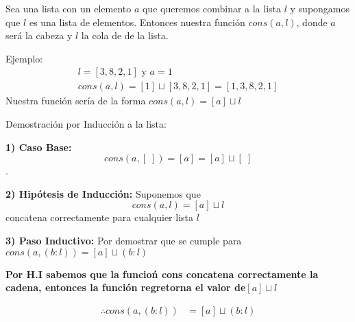    Sea una lista con un elemento $a$ que queremos combinar a la lista $l$ y supongamos que $l$ es una lista de elementos.
    Entonces nuestra función $cons(a,l)$, donde $a$ será la cabeza y $l$ la cola de de la lista.

    Ejemplo:
    \begin{gather*}
        l=[3,8,2,1] \text{ y } a=1\\
        cons(a,l)=[1]\sqcup [3,8,2,1] = [1,3,8,2,1]
    \end{gather*}
    Nuestra función sería de la forma $cons(a,l)=[a]\sqcup l$

    Demostración por Inducción a la lista:

    \textbf{1) Caso Base:} $$cons(a,[\;]) =[a] =[a]\sqcup [\;]$$.

    \textbf{2) Hipótesis de Inducción: }Suponemos que $$cons(a,l)=[a]\sqcup l$$ concatena correctamente para cualquier lista $l$   

    \textbf{3) Paso Inductivo: }Por demostrar que se cumple para $cons(a,(b:l))=[a]\sqcup (b:l)$
\vspace*{1em}

\textbf{Por H.I sabemos que la funcioń cons concatena correctamente la cadena, entonces la función regretorna el valor de}$[a]\sqcup l$ 

    \begin{align}
            \therefore cons(a,(b:l))&=[a]\sqcup (b:l)
    \end{align}
